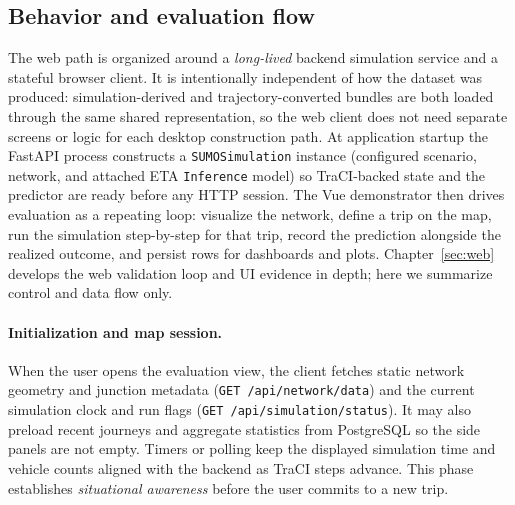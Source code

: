 \subsection{Behavior and evaluation flow}\label{sec:system:web:flow}
The web path is organized around a \emph{long-lived} backend simulation service and a stateful browser client. It is intentionally independent of how the dataset was produced: simulation-derived and trajectory-converted bundles are both loaded through the same shared representation, so the web client does not need separate screens or logic for each desktop construction path. At application startup the FastAPI process constructs a \texttt{SUMOSimulation} instance (configured scenario, network, and attached ETA \texttt{Inference} model) so TraCI-backed state and the predictor are ready before any HTTP session. The Vue demonstrator then drives evaluation as a repeating loop: visualize the network, define a trip on the map, run the simulation step-by-step for that trip, record the prediction alongside the realized outcome, and persist rows for dashboards and plots. Chapter~\ref{sec:web} develops the web validation loop and UI evidence in depth; here we summarize control and data flow only.

\paragraph{Initialization and map session.}
When the user opens the evaluation view, the client fetches static network geometry and junction metadata (\texttt{GET /api/network/data}) and the current simulation clock and run flags (\texttt{GET /api/simulation/status}). It may also preload recent journeys and aggregate statistics from PostgreSQL so the side panels are not empty. Timers or polling keep the displayed simulation time and vehicle counts aligned with the backend as TraCI steps advance. This phase establishes \emph{situational awareness} before the user commits to a new trip.

